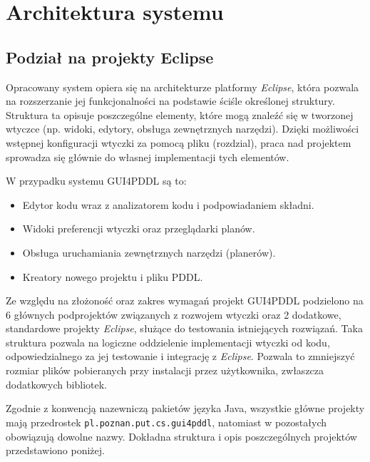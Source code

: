 \chapter{Architektura systemu}
\section{Podział na projekty Eclipse}

Opracowany system opiera się na architekturze platformy \emph{Eclipse}, która pozwala na rozszerzanie jej funkcjonalności na podstawie ściśle określonej struktury. Struktura ta opisuje poszczególne elementy, które mogą znaleźć się w tworzonej wtyczce (np. widoki, edytory, obsługa zewnętrznych narzędzi). Dzięki możliwości wstępnej konfiguracji wtyczki za pomocą pliku (rozdzial), praca nad projektem sprowadza się głównie do własnej implementacji tych elementów. 

W przypadku systemu GUI4PDDL są to:
\begin{itemize}
\item Edytor kodu wraz z analizatorem kodu i podpowiadaniem składni.
\item Widoki preferencji wtyczki oraz przeglądarki planów.
\item Obsługa uruchamiania zewnętrznych narzędzi (planerów).
\item Kreatory nowego projektu i pliku PDDL.
\end{itemize}

Ze względu na złożoność oraz zakres wymagań projekt GUI4PDDL podzielono na 6 głównych podprojektów związanych z rozwojem wtyczki oraz 2 dodatkowe, standardowe projekty \emph{Eclipse}, służące do testowania istniejących rozwiązań. Taka struktura pozwala na logiczne oddzielenie implementacji wtyczki od kodu, odpowiedzialnego za jej testowanie i integrację z \emph{Eclipse}. Pozwala to zmniejszyć rozmiar plików pobieranych przy instalacji przez użytkownika, zwłaszcza dodatkowych bibliotek.

Zgodnie z konwencją nazewniczą pakietów języka Java, wszystkie główne projekty mają przedrostek \texttt{pl.poznan.put.cs.gui4pddl}, natomiast w pozostałych obowiązują dowolne nazwy. Dokładna struktura i opis poszczególnych projektów przedstawiono poniżej.

